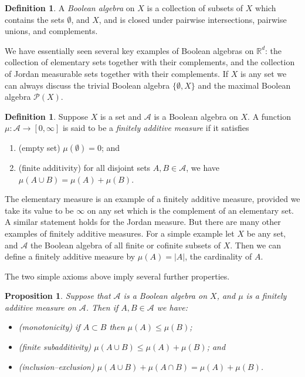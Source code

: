 \documentclass[11pt,oneside]{amsbook}
\newcommand{\RR}{{\mathbb R}}
\theoremstyle{definition}
\theoremstyle{plain}
\newtheorem{prop}[thm]{Proposition}
\theoremstyle{definition}
\newtheorem{defn}[thm]{Definition}
\theoremstyle{remark}
\numberwithin{equation}{section}
\numberwithin{figure}{section}
\begin{document}
\begin{defn}
  A \emph{Boolean algebra} on $X$ is a collection of subsets of $X$ which contains the sets $\emptyset$, and $X$, and is closed under pairwise intersections, pairwise unions, and complements.
\end{defn}

We have essentially seen several key examples of Boolean algebras on $\RR^d$: the collection of elementary sets together with their complements, and the collection of Jordan measurable sets together with their complements. If $X$ is any set we can always discuss the trivial Boolean algebra $\{\emptyset,X\}$ and the maximal Boolean algebra $\mathcal P(X)$.

\begin{defn}
  Suppose $X$ is a set and $\mathcal A$ is a Boolean algebra on $X$. A function $\mu\colon\mathcal A\to[0,\infty]$ is said to be a \emph{finitely additive measure} if it satisfies
  \begin{enumerate}
  \item (empty set) $\mu(\emptyset)=0$; and
  \item (finite additivity) for all disjoint sets $A,B\in\mathcal A$, we have $\mu(A\cup B)=\mu(A)+\mu(B)$.
  \end{enumerate}
\end{defn}

The elementary measure is an example of a finitely additive measure, provided we take its value to be $\infty$ on any set which is the complement of an elementary set. A similar statement holds for the Jordan measure. But there are many other examples of finitely additive measures. For a simple example let $X$ be any set, and $\mathcal A$ the Boolean algebra of all finite or cofinite subsets of $X$. Then we can define a finitely additive measure by $\mu(A)=|A|$, the cardinality of $A$.

The two simple axioms above imply several further properties.

\begin{prop}
  Suppose that $\mathcal A$ is a Boolean algebra on $X$, and $\mu$ is a finitely additive measure on $\mathcal A$. Then if $A,B\in\mathcal A$ we have:
  \begin{itemize}
  \item (monotonicity) if $A\subset B$ then $\mu(A)\leq\mu(B)$;
  \item (finite subadditivity) $\mu(A\cup B)\leq\mu(A)+\mu(B)$; and
  \item (inclusion--exclusion) $\mu(A\cup B)+\mu(A\cap B)=\mu(A)+\mu(B)$.
  \end{itemize}
\end{prop}
\end{document}
